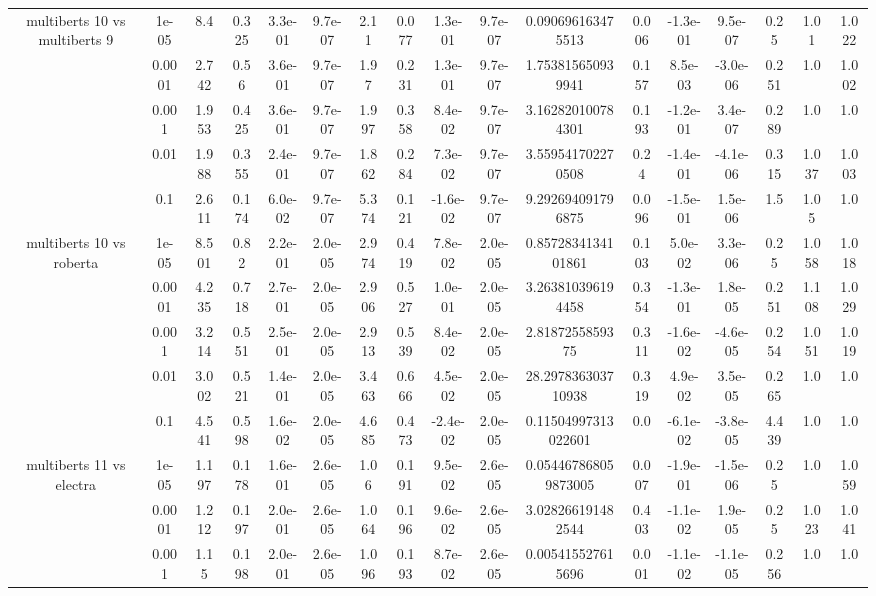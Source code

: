 \begin{tabular}{|c|c|c|c|c|c|c|c|c|c|c|c|c|c|c|c|c|}
\hline
\multirow{5}{*}{multiberts 10 vs multiberts 9} & 1e-05 & 8.4 & 0.325 & 3.3e-01 & 9.7e-07 & 2.11 & 0.077 & 1.3e-01 & 9.7e-07 & 0.090696163475513 & 0.006 & -1.3e-01 & 9.5e-07 & 0.25 & 1.01 & 1.022 \\
 & 0.0001 & 2.742 & 0.56 & 3.6e-01 & 9.7e-07 & 1.97 & 0.231 & 1.3e-01 & 9.7e-07 & 1.753815650939941 & 0.157 & 8.5e-03 & -3.0e-06 & 0.251 & 1.0 & 1.002 \\
 & 0.001 & 1.953 & 0.425 & 3.6e-01 & 9.7e-07 & 1.997 & 0.358 & 8.4e-02 & 9.7e-07 & 3.162820100784301 & 0.193 & -1.2e-01 & 3.4e-07 & 0.289 & 1.0 & 1.0 \\
 & 0.01 & 1.988 & 0.355 & 2.4e-01 & 9.7e-07 & 1.862 & 0.284 & 7.3e-02 & 9.7e-07 & 3.559541702270508 & 0.24 & -1.4e-01 & -4.1e-06 & 0.315 & 1.037 & 1.003 \\
 & 0.1 & 2.611 & 0.174 & 6.0e-02 & 9.7e-07 & 5.374 & 0.121 & -1.6e-02 & 9.7e-07 & 9.292694091796875 & 0.096 & -1.5e-01 & 1.5e-06 & 1.5 & 1.05 & 1.0 \\
\hline
\multirow{5}{*}{multiberts 10 vs roberta } & 1e-05 & 8.501 & 0.82 & 2.2e-01 & 2.0e-05 & 2.974 & 0.419 & 7.8e-02 & 2.0e-05 & 0.8572834134101861 & 0.103 & 5.0e-02 & 3.3e-06 & 0.25 & 1.058 & 1.018 \\
 & 0.0001 & 4.235 & 0.718 & 2.7e-01 & 2.0e-05 & 2.906 & 0.527 & 1.0e-01 & 2.0e-05 & 3.263810396194458 & 0.354 & -1.3e-01 & 1.8e-05 & 0.251 & 1.108 & 1.029 \\
 & 0.001 & 3.214 & 0.551 & 2.5e-01 & 2.0e-05 & 2.913 & 0.539 & 8.4e-02 & 2.0e-05 & 2.8187255859375 & 0.311 & -1.6e-02 & -4.6e-05 & 0.254 & 1.051 & 1.019 \\
 & 0.01 & 3.002 & 0.521 & 1.4e-01 & 2.0e-05 & 3.463 & 0.666 & 4.5e-02 & 2.0e-05 & 28.297836303710938 & 0.319 & 4.9e-02 & 3.5e-05 & 0.265 & 1.0 & 1.0 \\
 & 0.1 & 4.541 & 0.598 & 1.6e-02 & 2.0e-05 & 4.685 & 0.473 & -2.4e-02 & 2.0e-05 & 0.11504997313022601 & 0.0 & -6.1e-02 & -3.8e-05 & 4.439 & 1.0 & 1.0 \\
\hline
\multirow{5}{*}{multiberts 11 vs electra } & 1e-05 & 1.197 & 0.178 & 1.6e-01 & 2.6e-05 & 1.06 & 0.191 & 9.5e-02 & 2.6e-05 & 0.054467868059873005 & 0.007 & -1.9e-01 & -1.5e-06 & 0.25 & 1.0 & 1.059 \\
 & 0.0001 & 1.212 & 0.197 & 2.0e-01 & 2.6e-05 & 1.064 & 0.196 & 9.6e-02 & 2.6e-05 & 3.028266191482544 & 0.403 & -1.1e-02 & 1.9e-05 & 0.25 & 1.023 & 1.041 \\
 & 0.001 & 1.15 & 0.198 & 2.0e-01 & 2.6e-05 & 1.096 & 0.193 & 8.7e-02 & 2.6e-05 & 0.005415527615696 & 0.001 & -1.1e-02 & -1.1e-05 & 0.256 & 1.0 & 1.0 \\

\end{tabular}
